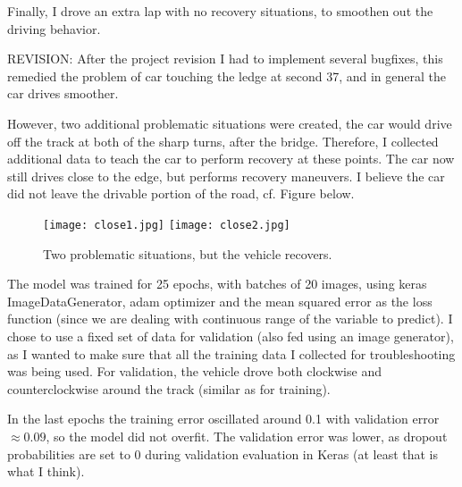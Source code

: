 \documentclass[a4paper,10pt]{article}
\begin{document}
Finally, I drove an extra lap with no recovery situations, to smoothen out the driving behavior.

REVISION: After the project revision I had to implement several bugfixes, 
this remedied the problem of car touching the ledge at second 37, and in general the car drives smoother.

However, two additional problematic situations were created, the car would drive off the track at both of the sharp turns, after the bridge.
Therefore, I collected additional data to teach the car to perform recovery at these points.
The car now still drives close to the edge, but performs recovery maneuvers. I believe the car did not leave the drivable portion of the road, cf. Figure below.

\begin{figure}[h]
  \begin{center}
\texttt{[image: close1.jpg]}\quad
\texttt{[image: close2.jpg]}
\caption{Two problematic situations, but the vehicle recovers.}
\end{center}
\end{figure}

The model was trained for 25 epochs, with batches of 20 images, using keras ImageDataGenerator, adam optimizer and the mean squared error as the loss function
(since we are dealing with continuous range of the variable to predict).
I chose to use a fixed set of data for validation (also fed using an image generator), 
as I wanted to make sure that all the training data I collected for troubleshooting was being used.
For validation, the vehicle drove both clockwise and counterclockwise around the track (similar as for training).

In the last epochs the training error oscillated around 0.1 with validation error $\approx 0.09$, so the model did not overfit.
The validation error was lower, as dropout probabilities are set to 0 during validation evaluation in Keras (at least that is what I think).
\end{document}
